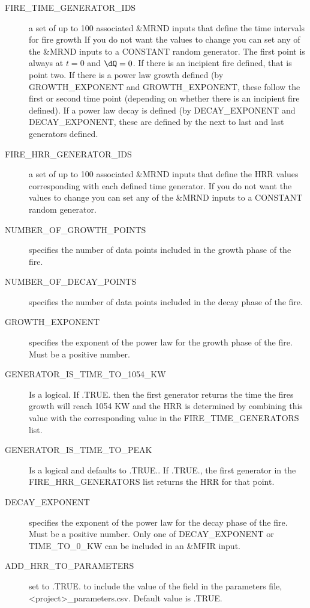 \documentclass[12pt,twoside]{book}
\begin{document}
\begin{description}
  \item[FIRE\_TIME\_GENERATOR\_IDS] a set of up to 100 associated {\ct \&MRND} inputs that define the time intervals for fire growth If you do not want the values to change you can set any of the {\ct \&MRND} inputs to a {\ct CONSTANT} random generator. The first point is always at $t=0$ and $\dQ = 0$. If there is an incipient fire defined, that is point two. If there is a power law growth defined (by {\ct GROWTH\_EXPONENT} and {\ct GROWTH\_EXPONENT}, these follow the first or second time point (depending on whether there is an incipient fire defined). If a power law decay is defined (by {\ct DECAY\_EXPONENT} and {\ct DECAY\_EXPONENT}, these are defined by the next to last and last generators defined.
  \item[FIRE\_HRR\_GENERATOR\_IDS] a set of up to 100 associated {\ct \&MRND} inputs that define the HRR values corresponding with each defined time generator. If you do not want the values to change you can set any of the {\ct \&MRND} inputs to a {\ct CONSTANT} random generator.
  \item[NUMBER\_OF\_GROWTH\_POINTS] specifies the number of data points included in the growth phase of the fire.
  \item[NUMBER\_OF\_DECAY\_POINTS] specifies the number of data points included in the decay phase of the fire.
  \item[GROWTH\_EXPONENT] specifies the exponent of the power law for the growth phase of the fire. Must be a positive number.
  \item[GENERATOR\_IS\_TIME\_TO\_1054\_KW] Is a logical. If {\ct .TRUE.} then the first generator returns the time the fires growth will reach 1054 KW and the HRR is determined by combining this value with the corresponding value in the {\ct FIRE\_TIME\_GENERATORS} list.
  \item[GENERATOR\_IS\_TIME\_TO\_PEAK] Is a logical and defaults to {\ct .TRUE.}. If {\ct .TRUE.}, the first generator in the {\ct FIRE\_HRR\_GENERATORS} list returns the HRR for that point.
  \item[DECAY\_EXPONENT] specifies the exponent of the power law for the decay phase of the fire. Must be a positive number. Only one of {\ct DECAY\_EXPONENT} or {\ct TIME\_TO\_0\_KW} can be included in an {\ct \&MFIR} input.
  \item[ADD\_HRR\_TO\_PARAMETERS] set to .TRUE. to include the value of the field in the parameters file, {\ct <project>\_parameters.csv}. Default value is .TRUE.

\end{description}
\end{document}
